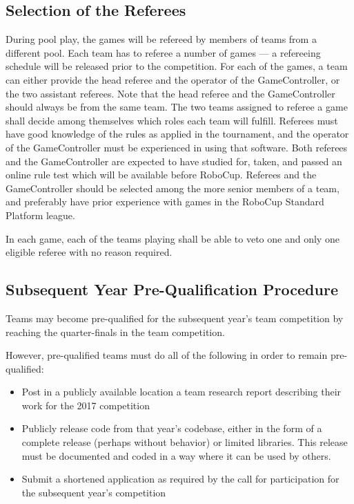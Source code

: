 \documentclass[12pt]{article}
\begin{document}
\subsection{Selection of the Referees}
\label{sec:refSelection}
During pool play, the games will be refereed by members of teams from a different pool.  Each team has to referee a number of games --- a refereeing schedule will be released prior to the competition. For each of the games, a team can either provide the head referee and the operator of the GameController, or the two assistant referees.  Note that the head referee and the GameController should always be from the same team.  The two teams assigned to referee a game shall decide among themselves which roles each team will fulfill.  Referees must have good knowledge of the rules as applied in the tournament, and the operator of the GameController must be experienced in using that software. Both referees and the GameController are expected to have studied for, taken, and passed an online rule test which will be available before RoboCup.  Referees and the GameController should be selected among the more senior members of a team, and preferably have prior experience with games in the RoboCup Standard Platform league.

In each game, each of the teams playing shall be able to veto one and only one eligible referee with no reason required.

\subsection{Subsequent Year Pre-Qualification Procedure}
\label{sec:preQual}
Teams may become pre-qualified for the subsequent year's team competition by reaching the quarter-finals in the team competition.

However, pre-qualified teams must do all of the following in order to remain pre-qualified:
\begin{itemize}
\item Post in a publicly available location a team research report describing their work for the 2017 competition
\item Publicly release code from that year's codebase, either in the form of a complete release (perhaps without behavior) or limited libraries.  This release must be documented and coded in a way where it can be used by others.
\item Submit a shortened application as required by the call for participation for the subsequent year's competition
\end{itemize}
\end{document}
